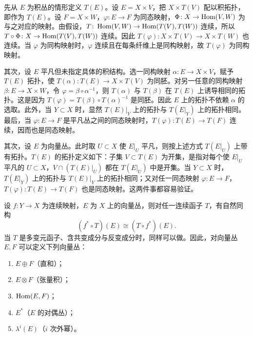 先从 $E$ 为积丛的情形定义 $T(E)$。设 $E=X\times V$，把 $X\times T(V)$ 配以积拓扑，即作为 $T(E)$。设 $F=X\times W$，$\varphi\colon E\to F$ 为同态映射，$\Phi\colon X\to\operatorname{Hom}(V,W)$ 为与之对应的映射。由假设，$T\colon\operatorname{Hom}(V,W)\to\operatorname{Hom}(T(V),T(W))$ 连续，所以
$T\circ\Phi\colon X\to\operatorname{Hom}(T(V),T(W))$ 连续。因此 $T(\varphi)\colon X\times T(V)\to X\times T(W)$ 也连续。当 $\varphi$ 为同构映射时，$\varphi$ 连续且在每条纤维上是同构映射，故 $T(\varphi)$ 为同构映射。

其次，设 $E$ 平凡但未指定具体的积结构。选一同构映射 $\alpha\colon E\to X\times V$，赋予 $T(E)$ 拓扑，使 $T(\alpha)\colon T(E)\to X\times T(V)$ 为同胚。对另一任意的同构映射 $\beta\colon E\to X\times W$，令 $\varphi=\beta\circ\alpha^{-1}$，则 $T(\alpha)$ 与 $T(\beta)$ 在 $T(E)$ 上诱导相同的拓扑。这是因为 $T(\varphi)=T(\beta)\circ T(\alpha)^{-1}$ 是同胚。因此 $E$ 上的拓扑不依赖 $\alpha$ 的选取。此外，当 $Y\subset X$ 时，显然 $T(E)|_Y$ 上的拓扑与 $T(E|_Y)$ 上的拓扑相同。最后，当 $\varphi\colon E\to F$ 是平凡丛之间的同态映射时，$T(\varphi)\colon T(E)\to T(F)$ 连续，因而也是同态映射。

其次，设 $E$ 为向量丛。此时取 $U\subset X$ 使 $E|_U$ 平凡，则按上述方式 $T(E|_U)$ 上带有拓扑。$T(E)$ 的拓扑定义如下：子集 $V\subset T(E)$ 为开集，是指对每个使 $E|_U$ 平凡的 $U\subset X$，$V\cap(T(E)|_U)$ 都在 $T(E|_U)$ 中是开集。当 $Y\subset X$ 时，$T(E|_Y)$ 上的拓扑与 $T(E)|_Y$ 上的拓扑相同；又对任一同态映射 $\varphi\colon E\to F$，$T(\varphi)\colon T(E)\to T(F)$ 也是同态映射。这两件事都容易验证。


设 $f\colon Y\to X$ 为连续映射，$E$ 为 $X$ 上的向量丛，则对任一连续函子 $T$，有自然同构
\[
(f^*\circ T)(E)\cong(T\circ f^*)(E).
\]
当 $T$ 是多变元函子、含共变成分与反变成分时，同样可以做。因此，对向量丛 $E, F$ 可以定义下列向量丛：

\begin{enumerate}[label=(\roman*),leftmargin=2.4em,itemsep=2pt]
\item $E\oplus F$（直和）；
\item $E\otimes F$（张量积）；
\item $\operatorname{Hom}(E,F)$；
\item $E^*$（$E$ 的对偶丛）；
\item $\lambda^i(E)$（$i$ 次外幂）。
\end{enumerate}


